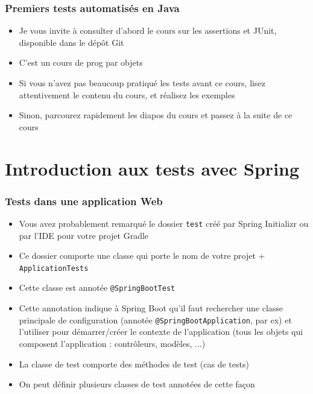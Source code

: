 \documentclass{beamer}
\begin{document}
\begin{frame}
	\frametitle{Premiers tests automatisés en Java}
	\begin{itemize}
		\item Je vous invite à consulter d'abord le cours sur les assertions et JUnit, disponible dans le dépôt Git
		\item C'est un cours de prog par objets
		\item Si vous n'avez pas beaucoup pratiqué les tests avant ce cours, lisez attentivement le contenu du cours, et réalisez les exemples
		\item Sinon, parcourez rapidement les diapos du cours et passez à la suite de ce cours
	\end{itemize}
\end{frame}

\section{Introduction aux tests avec Spring}

\begin{frame}
  \frametitle{Tests dans une application Web}
  \begin{itemize}
  \item Vous avez probablement remarqué le dossier \texttt{test} créé par Spring Initializr ou par l'IDE pour votre projet Gradle
  \item Ce dossier comporte une classe qui porte le nom de votre projet + \texttt{ApplicationTests}
  \item Cette classe est annotée \texttt{@SpringBootTest}
  \item Cette annotation indique à Spring Boot qu'il faut rechercher une classe principale de configuration (annotée \texttt{@SpringBootApplication}, par ex) et l'utiliser pour démarrer/créer le contexte de l'application (tous les objets qui composent l'application : contrôleurs, modèles, ...)
  \item La classe de test comporte des méthodes de test (cas de tests)
  \item On peut définir plusieurs classes de test annotées de cette façon
\end{itemize}
\end{frame}
\end{document}
